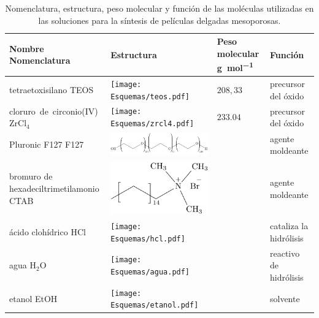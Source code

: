 				\begin{table}[ht!] 
						  \caption[Reactivos para los soles]{Nomenclatura, estructura, peso molecular y función de las moléculas utilizadas en las soluciones para la síntesis de películas delgadas mesoporosas.} 
				  		  \begin{tabular}{>{\raggedright\arraybackslash}m{2.40cm}>{\centering\arraybackslash}m{4cm}>{\centering\arraybackslash}m{2.35cm}>{\raggedright\arraybackslash}m{1.7cm}} 
				  		  \toprule
						  Nombre Nomenclatura    & Estructura & Peso molecular \si{g.mol^{-1}} & Función\\ \midrule
				      	  tetraetoxisilano\index{tetraetoxisilano} TEOS & \texttt{[image: Esquemas/teos.pdf]} & $208,33$ & precursor\index{precursor} del óxido  \\ \midrule
				      	  \mbox{cloruro de circonio(IV)}  Zr\index{circonio}Cl$_4$ & \texttt{[image: Esquemas/zrcl4.pdf]} & $233.04$ & precursor\index{precursor} del óxido  \\ \midrule
				  		  Pluronic F127\index{Pluronic F127} F127    & \hspace*{-10px} \includegraphics[scale=0.5]{Esquemas/f127.pdf} & \multirow{1}{*}{$13800$}	 & agente moldeante\index{agente moldeante}	 \\ \midrule
				  		  bromuro de hexadeciltrimetilamonio\index{bromuro de hexadeciltrimetilamonio}  CTAB   & \hspace*{1cm} \includegraphics[scale=0.6]{Esquemas/ctab.pdf} & \multirow{1}{*}{$364.48$}	 & agente moldeante\index{agente moldeante}	 \\ \midrule
				  		  ácido\index{acido@ácido} clohídrico\index{acido@ácido!clohídrico} HCl\index{acido@ácido!clohídrico}& \texttt{[image: Esquemas/hcl.pdf]}  & \multirow{1}{*}{$36,46$}   & cataliza la hidrólisis\index{hidrolisis@hidrólisis} \\ \midrule
				  		  agua \hspace{2cm} H$_2$O  &  \texttt{[image: Esquemas/agua.pdf]}  & \multirow{1}{*}{$18,02$}   & reactivo de hidrólisis\index{hidrolisis@hidrólisis} \\ \midrule
				  		  etanol\index{etanol} \hspace{2cm} EtOH\index{etanol}  & \texttt{[image: Esquemas/etanol.pdf]}  & \multirow{1}{*}{$46,07$}   & solvente \\ 
				  		  \bottomrule
				    	  \end{tabular}
				   		  \label{tabla:reactivos}
					      \end{table}

